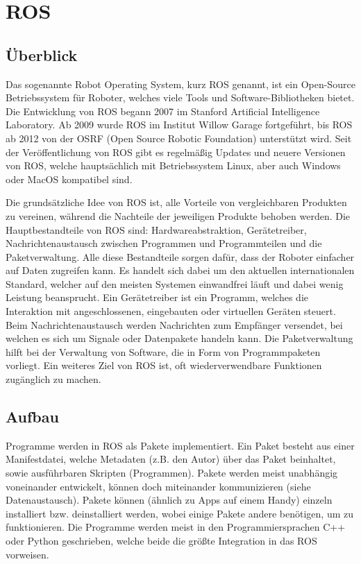 \section{ROS}
{
	\subsection{Überblick}
	{
		Das sogenannte Robot Operating System, kurz ROS genannt, ist ein Open-Source Betriebssystem für Roboter, welches viele Tools und Software-Bibliotheken bietet. Die Entwicklung von ROS begann 2007 im Stanford Artificial Intelligence Laboratory. Ab 2009 wurde ROS im Institut Willow Garage fortgeführt, bis ROS ab 2012 von der OSRF (Open Source Robotic Foundation) unterstützt wird. Seit der Veröffentlichung von ROS gibt es regelmäßig Updates und neuere Versionen von ROS, welche hauptsächlich mit Betriebssystem Linux, aber auch Windows oder MacOS kompatibel sind. 
		
		Die grundsätzliche Idee von ROS ist, alle Vorteile von vergleichbaren Produkten zu vereinen, während die Nachteile der jeweiligen Produkte behoben werden. Die Hauptbestandteile von ROS sind: Hardwareabstraktion, Gerätetreiber, Nachrichtenaustausch zwischen Programmen und Programmteilen und die Paketverwaltung. Alle diese Bestandteile sorgen dafür, dass der Roboter einfacher auf Daten zugreifen kann. Es handelt sich dabei um den aktuellen internationalen Standard, welcher auf den meisten Systemen einwandfrei läuft und dabei wenig Leistung beansprucht. Ein Gerätetreiber ist ein Programm, welches die Interaktion mit angeschlossenen, eingebauten oder virtuellen Geräten steuert. Beim Nachrichtenaustausch werden Nachrichten zum Empfänger versendet, bei welchen es sich um Signale oder Datenpakete handeln kann. Die Paketverwaltung hilft bei der Verwaltung von Software, die in Form von Programmpaketen vorliegt. Ein weiteres Ziel von ROS ist, oft wiederverwendbare Funktionen zugänglich zu machen. 
		
	}

	\subsection{Aufbau}
	{ Programme werden in ROS als Pakete implementiert. Ein Paket besteht aus einer Manifestdatei, welche Metadaten (z.B. den Autor) über das Paket beinhaltet, sowie ausführbaren Skripten (Programmen). Pakete werden meist unabhängig voneinander entwickelt, können doch miteinander kommunizieren (siehe Datenaustausch). Pakete können (ähnlich zu Apps auf einem Handy) einzeln installiert bzw. deinstalliert werden, wobei einige Pakete andere benötigen, um zu funktionieren. Die Programme werden meist in den Programmiersprachen C++ oder Python geschrieben, welche beide die größte Integration in das ROS vorweisen.
	
}}
